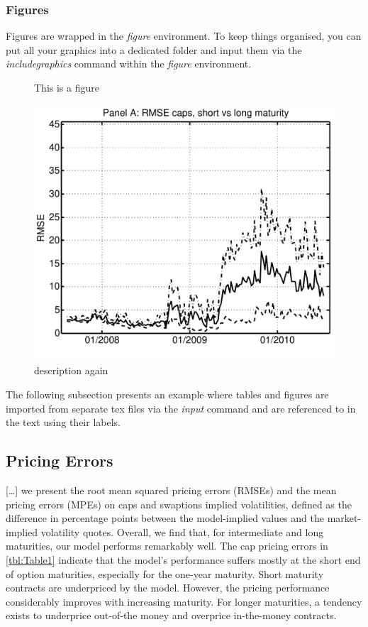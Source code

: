 \documentclass[11pt,a4paper,english,oneside]{book}
\begin{document}
\subsubsection{Figures}
Figures are wrapped in the \emph{figure} environment. To keep things organised, you can put all your graphics into a dedicated folder and input them via the \emph{includegraphics} command within the \emph{figure} environment.

\begin{figure}[h!tbp] %
    \caption{This is a figure\label{fig:a_fig}}
    \caption*{\tiny description again}
    \center%
    \includegraphics[width=0.5\linewidth]{Graphics/RMSE_ivcapsjoint.pdf} %
\end{figure}

The following subsection presents an example where tables and figures are imported from separate tex files via the \emph{input} command and are referenced to in the text using their labels.

\subsection{Pricing Errors}

[\dots] we present the root mean squared pricing errors (RMSEs) and the mean pricing errors (MPEs) on caps and swaptions implied volatilities, defined as the difference in percentage points between the model-implied values and the market-implied volatility quotes. Overall, we find that, for intermediate and long maturities, our model performs remarkably well. The cap pricing errors in \cref{tbl:Table1} indicate that the model's performance suffers mostly at the short end of option maturities, especially for the one-year maturity. Short maturity contracts are underpriced by the model. However, the pricing performance considerably improves with increasing maturity. For longer maturities, a tendency exists to underprice out-of-the money and overprice in-the-money contracts.
\end{document}
